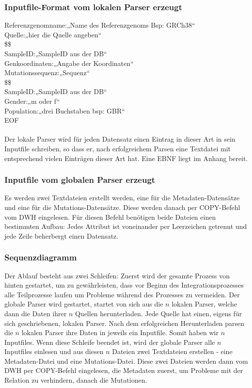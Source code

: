 \subsubsection{Inputfile-Format vom lokalen Parser erzeugt}
Referenzgenomname:„Name des Referenzgenoms Bsp: GRCh38“\\
Quelle:„hier die Quelle angeben“\\
\$\$\\
SampleID:„SampleID aus der DB“\\
Genkoordinaten:„Angabe der Koordinaten“ \\
Mutationssequenz:„Sequenz“\\
\$\$\\
SampleID:„SampleID aus der DB“\\
Gender:„m oder f“\\
Population:„drei Buchstaben bsp: GBR“ \\
EOF\\
\\
Der lokale Parser wird für jeden Datensatz einen Eintrag in dieser Art in sein Inputfile schreiben, so dass er, nach erfolgreichem Parsen eine Textdatei mit entsprechend vielen Einträgen dieser Art hat. Eine EBNF liegt im Anhang bereit.\\
\subsubsection{Inputfile vom globalen Parser erzeugt}
Es werden zwei Textdateien erstellt werden, eine für die Metadaten-Datensätze und eine für die Mutations-Datensätze. Diese werden danach per COPY-Befehl vom DWH eingelesen. Für diesen Befehl benötigen beide Dateien einen bestimmten Aufbau: Jedes Attribut ist voneinander per Leerzeichen getrennt und jede Zeile beherbergt einen Datensatz.
\subsubsection{Sequenzdiagramm}
Der Ablauf besteht aus zwei Schleifen: Zuerst wird der gesamte Prozess von hinten gestartet, um zu gewährleisten, dass vor Beginn des Integrationsprozesses alle Teilprozesse laufen um Probleme während des Prozesses zu vermeiden. Der globale Parser wird gestartet, startet von sich aus die $n$ lokalen Parser, welche dann die Daten ihrer $n$ Quellen herunterladen. Jede Quelle hat einen, eigens für sich geschriebenen, lokalen Parser. Nach dem erfolgreichen Herunterladen parsen die $n$ lokalen Parser ihre Daten in jeweils ein Inputfile. Somit haben wir $n$ Inputfiles. Wenn diese Schleife beendet ist, wird der globale Parser alle $n$ Inputfiles einlesen und aus diesen $n$ Dateien zwei Textdateien erstellen - eine Metadaten-Datei und eine Mutations-Datei. Diese zwei Dateien werden dann vom DWH per COPY-Befehl eingelesen, die Metadaten zuerst, um Probleme mit der Relation zu verhindern, danach die Mutationen.
\newpage
